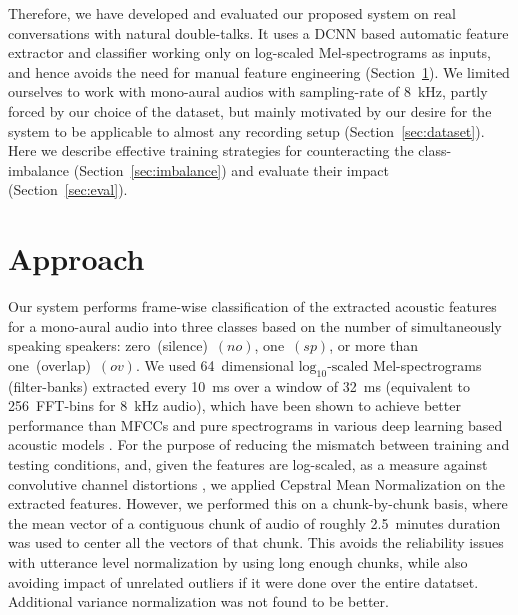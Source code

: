 \documentclass[a4paper]{article}
\begin{document}
Therefore, we have developed and evaluated our proposed system on real conversations with natural double-talks.
It uses a DCNN based automatic feature extractor and classifier working only on
log-scaled Mel-spectrograms as inputs,
and hence avoids the need for manual feature engineering
(Section~\ref{sec:approach}).
We limited ourselves to work with mono-aural audios with sampling-rate of 8~kHz,
partly forced by our choice of the dataset,
but mainly motivated by our desire for the system to be applicable to almost any recording setup
(Section~\ref{sec:dataset}).
Here we describe effective training strategies for counteracting the class-imbalance
(Section~\ref{sec:imbalance}) and evaluate their impact (Section~\ref{sec:eval}).

\section{Approach} \label{sec:approach}
Our system performs frame-wise classification of the extracted acoustic features for a mono-aural audio into three classes based on the number of simultaneously speaking speakers:
zero~(silence)~$(no)$, one~$(sp)$, or more than one~(overlap)~$(ov)$.
We used 64~dimensional $\text{log}_{10} \text{-scaled}$ Mel-spectrograms (filter-banks)
extracted every 10~ms over a window of 32~ms (equivalent to 256~FFT-bins for 8~kHz audio),
which have been shown to achieve better performance than MFCCs and pure spectrograms
in various deep learning based acoustic models \cite{deng_recent_2013}.
For the purpose of reducing the mismatch between training and testing conditions,
and, given the features are log-scaled, as a measure against convolutive channel distortions \cite{li_overview_2014},
we applied Cepstral Mean Normalization on the extracted features.
However, we performed this on a chunk-by-chunk basis,
where the mean vector of a contiguous chunk of audio of roughly 2.5~minutes duration was used to center all the vectors of that chunk.
This avoids the reliability issues with utterance level normalization \cite{prasad_improved_2013}
by using long enough chunks,
while also avoiding impact of unrelated outliers if it were done over the entire datatset.
Additional variance normalization was not found to be better.
\end{document}

